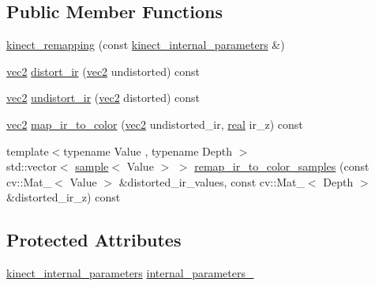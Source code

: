 \subsection*{Public Member Functions}
\begin{DoxyCompactItemize}
\item 
\hyperlink{classtlz_1_1kinect__remapping_ad19de7f5c79b616ff9183bc3c918dba8}{kinect\+\_\+remapping} (const \hyperlink{structtlz_1_1kinect__internal__parameters}{kinect\+\_\+internal\+\_\+parameters} \&)
\item 
\hyperlink{namespacetlz_ae192989bfbe6c700ac84d2a8cf05ebb4}{vec2} \hyperlink{classtlz_1_1kinect__remapping_a831ade1537415f733be62e7f606cbcb2}{distort\+\_\+ir} (\hyperlink{namespacetlz_ae192989bfbe6c700ac84d2a8cf05ebb4}{vec2} undistorted) const 
\item 
\hyperlink{namespacetlz_ae192989bfbe6c700ac84d2a8cf05ebb4}{vec2} \hyperlink{classtlz_1_1kinect__remapping_a3d6842deee81ce9d61b335a4b053337a}{undistort\+\_\+ir} (\hyperlink{namespacetlz_ae192989bfbe6c700ac84d2a8cf05ebb4}{vec2} distorted) const 
\item 
\hyperlink{namespacetlz_ae192989bfbe6c700ac84d2a8cf05ebb4}{vec2} \hyperlink{classtlz_1_1kinect__remapping_a0ab08ec0c7f71c5a7f6f7459d723affe}{map\+\_\+ir\+\_\+to\+\_\+color} (\hyperlink{namespacetlz_ae192989bfbe6c700ac84d2a8cf05ebb4}{vec2} undistorted\+\_\+ir, \hyperlink{namespacetlz_a15fd37cce97f2b8b606af18c2615f602}{real} ir\+\_\+z) const 
\item 
{\footnotesize template$<$typename Value , typename Depth $>$ }\\std\+::vector$<$ \hyperlink{classtlz_1_1kinect__remapping_a10367314ff6c1cb5696f087454ec9f7f}{sample}$<$ Value $>$ $>$ \hyperlink{classtlz_1_1kinect__remapping_ade5a57b1715a58352b9edc74b4a88f6b}{remap\+\_\+ir\+\_\+to\+\_\+color\+\_\+samples} (const cv\+::\+Mat\+\_\+$<$ Value $>$ \&distorted\+\_\+ir\+\_\+values, const cv\+::\+Mat\+\_\+$<$ Depth $>$ \&distorted\+\_\+ir\+\_\+z) const 
\end{DoxyCompactItemize}
\subsection*{Protected Attributes}
\begin{DoxyCompactItemize}
\item 
\hyperlink{structtlz_1_1kinect__internal__parameters}{kinect\+\_\+internal\+\_\+parameters} \hyperlink{classtlz_1_1kinect__remapping_a18032d6bb860fda0a2313818963b4ef6}{internal\+\_\+parameters\+\_\+}
\end{DoxyCompactItemize}


